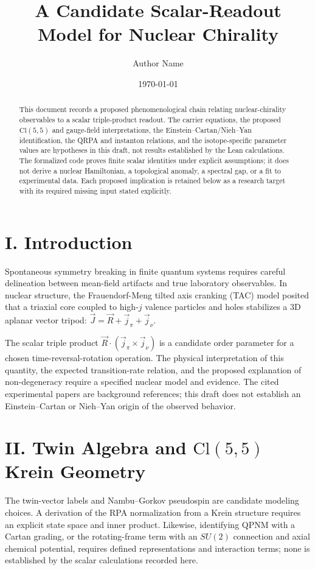 \documentclass[aps,prl,reprint,superscriptaddress,nofootinbib,amsmath,amssymb]{revtex4-2}
\begin{document}
\title{A Candidate Scalar-Readout Model for Nuclear Chirality}

\author{Author Name}

\date{\today}

\begin{abstract}
This document records a proposed phenomenological chain relating nuclear-chirality observables to a scalar triple-product readout. The carrier equations, the proposed $\mathrm{Cl}(5,5)$ and gauge-field interpretations, the Einstein--Cartan/Nieh--Yan identification, the QRPA and instanton relations, and the isotope-specific parameter values are hypotheses in this draft, not results established by the Lean calculations. The formalized code proves finite scalar identities under explicit assumptions; it does not derive a nuclear Hamiltonian, a topological anomaly, a spectral gap, or a fit to experimental data. Each proposed implication is retained below as a research target with its required missing input stated explicitly.
\end{abstract}

\maketitle

\section{I. Introduction}
Spontaneous symmetry breaking in finite quantum systems requires careful delineation between mean-field artifacts and true laboratory observables. In nuclear structure, the Frauendorf-Meng tilted axis cranking (TAC) model \cite{Frauendorf1997} posited that a triaxial core coupled to high-$j$ valence particles and holes stabilizes a 3D aplanar vector tripod: $\vec{J} = \vec{R} + \vec{j}_\pi + \vec{j}_\nu$.

The scalar triple product $\vec{R} \cdot (\vec{j}_\pi \times \vec{j}_\nu)$ is a candidate order parameter for a chosen time-reversal-rotation operation. The physical interpretation of this quantity, the expected transition-rate relation, and the proposed explanation of non-degeneracy require a specified nuclear model and evidence. The cited experimental papers are background references; this draft does not establish an Einstein--Cartan or Nieh--Yan origin of the observed behavior.

\section{II. Twin Algebra and $\mathrm{Cl}(5,5)$ Krein Geometry}
The twin-vector labels and Nambu--Gorkov pseudospin are candidate modeling choices. A derivation of the RPA normalization from a Krein structure requires an explicit state space and inner product. Likewise, identifying QPNM with a Cartan grading, or the rotating-frame term with an $SU(2)$ connection and axial chemical potential, requires defined representations and interaction terms; none is established by the scalar calculations recorded here.
\end{document}
